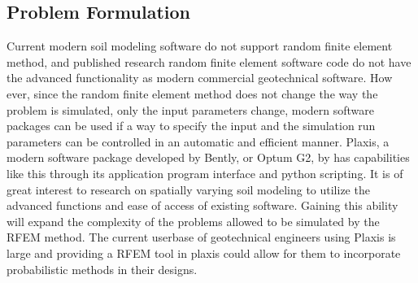 \subsection*{Problem Formulation}
Current modern soil modeling software do not support random finite element method, and published research random finite element software code do not have the advanced functionality as modern commercial geotechnical software.
How ever, since the random finite element method does not change the way the problem is simulated, only the input parameters change, modern software packages can be used if a way to specify the input and the simulation run parameters can be controlled in an automatic and efficient manner.
Plaxis, a modern software package developed by Bently, or Optum G2, by has capabilities like this through its application program interface and python scripting. 
It is of great interest to research on spatially varying soil modeling to utilize the advanced functions and ease of access of existing software. Gaining this ability will expand the complexity of the problems allowed to be simulated by the RFEM method. The current userbase of geotechnical engineers using Plaxis is large and providing a RFEM tool in plaxis could allow for them to incorporate probabilistic methods in their designs.

